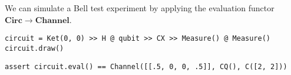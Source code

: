 \begin{example}
We can simulate a Bell test experiment by applying the evaluation functor $\mathbf{Circ} \to \mathbf{Channel}$.

\begin{verbatim}
circuit = Ket(0, 0) >> H @ qubit >> CX >> Measure() @ Measure()
circuit.draw()
\end{verbatim}
\begin{verbatim}
assert circuit.eval() == Channel([[.5, 0, 0, .5]], CQ(), C([2, 2]))
\end{verbatim}
\end{example}
